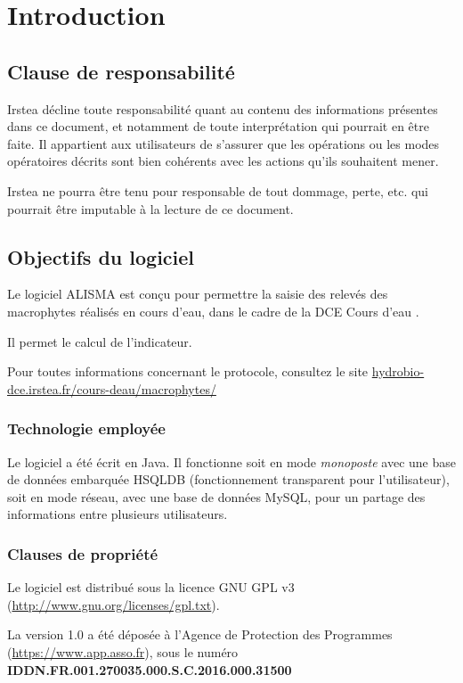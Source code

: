 \chapter{Introduction}

\section{Clause de responsabilité}

Irstea décline toute responsabilité quant au contenu des informations présentes dans ce document, et notamment de toute interprétation qui pourrait en être faite. Il appartient aux utilisateurs de s'assurer que les opérations ou les modes opératoires décrits sont bien cohérents avec les actions qu'ils souhaitent mener. 

Irstea ne pourra être tenu pour responsable de tout dommage, perte, etc. qui pourrait être imputable à la lecture de ce document.

\section{Objectifs du logiciel}
Le logiciel ALISMA est conçu pour permettre la saisie des relevés des macrophytes réalisés en cours d'eau, dans le cadre de la DCE \og Cours d'eau \fg{}. 

Il permet le calcul de l'indicateur.

Pour toutes informations concernant le protocole, consultez le site \href{https://hydrobio-dce.irstea.fr/cours-deau/macrophytes/}{hydrobio-dce.irstea.fr/cours-deau/macrophytes/}

\subsection{Technologie employée}
Le logiciel a été écrit en Java. Il fonctionne soit en mode \textit{monoposte} avec une base de données embarquée HSQLDB (fonctionnement transparent pour l'utilisateur), soit en mode réseau, avec une base de données MySQL, pour un partage des informations entre plusieurs utilisateurs.

\subsection{Clauses de propriété}
Le logiciel est distribué sous la licence GNU GPL v3 (\url{http://www.gnu.org/licenses/gpl.txt}).

La version 1.0 a été déposée à l'Agence de Protection des Programmes (\url{https://www.app.asso.fr}), sous le numéro \textbf{IDDN.FR.001.270035.000.S.C.2016.000.31500}

